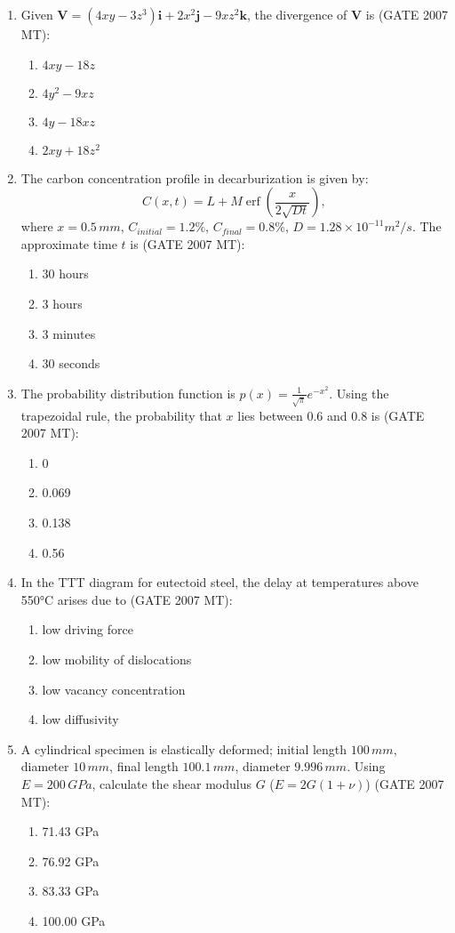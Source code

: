 \documentclass[12pt]{article}
\begin{document}
\begin{enumerate}
\item Given \(\mathbf{V} = (4xy - 3z^3)\mathbf{i} + 2x^2 \mathbf{j} - 9xz^2 \mathbf{k}\), the divergence of \(\mathbf{V}\) is (GATE 2007 MT):
\begin{enumerate}
  \item \(4xy - 18z\)
  \item \(4y^2 - 9xz\)
  \item \(4y - 18xz\)
  \item \(2xy + 18 z^2\)
\end{enumerate}

\item The carbon concentration profile in decarburization is given by:
\[
C(x,t) = L + M \operatorname{erf}\left(\frac{x}{2\sqrt{Dt}}\right),
\]
where \(x=0.5\,mm\), \(C_{initial} = 1.2\%\), \(C_{final} = 0.8\%\), \(D = 1.28 \times 10^{-11} m^2/s\). The approximate time \(t\) is (GATE 2007 MT):
\begin{enumerate}
  \item 30 hours
  \item 3 hours
  \item 3 minutes
  \item 30 seconds
\end{enumerate}

\item The probability distribution function is \(p(x) = \frac{1}{\sqrt{\pi}} e^{-x^2}\). Using the trapezoidal rule, the probability that \(x\) lies between 0.6 and 0.8 is (GATE 2007 MT):
\begin{enumerate}
  \item 0
  \item 0.069
  \item 0.138
  \item 0.56
\end{enumerate}

\item In the TTT diagram for eutectoid steel, the delay at temperatures above 550°C arises due to (GATE 2007 MT):
\begin{enumerate}
  \item low driving force
  \item low mobility of dislocations
  \item low vacancy concentration
  \item low diffusivity
\end{enumerate}

\item A cylindrical specimen is elastically deformed; initial length \(100\,mm\), diameter \(10\,mm\), final length \(100.1\,mm\), diameter \(9.996\,mm\). Using \(E=200\,GPa\), calculate the shear modulus \(G\) (\(E=2G(1+\nu)\)) (GATE 2007 MT):
\begin{enumerate}
  \item 71.43 GPa
  \item 76.92 GPa
  \item 83.33 GPa
  \item 100.00 GPa
\end{enumerate}


\end{enumerate}
\end{document}
